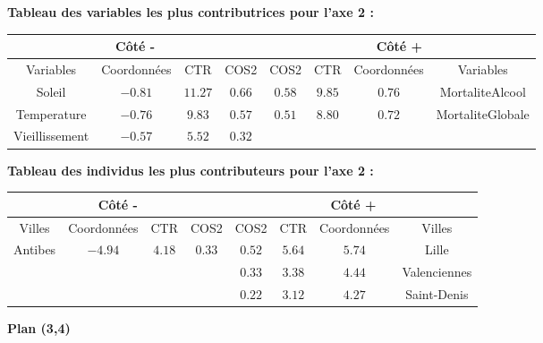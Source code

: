 \documentclass{article}
\begin{document}
\textbf{Tableau des variables les plus contributrices pour l'axe 2 :}
\begin{center}
\begin{tabular}{|c|c|c|c||c|c|c|c|}
\multicolumn{4}{c}{Côté -} & \multicolumn{4}{c}{Côté +}\\
\hline 
Variables & Coordonnées & CTR & COS2 & COS2 & CTR & Coordonnées & Variables \\ 
\hline 
Soleil & $-0.81$ & $11.27$ & $0.66$  & $0.58$  & $9.85$ & $0.76$ & MortaliteAlcool  \\ 
\hline 
 Temperature& $-0.76$ & $9.83$ & $0.57$ & $0.51$ & $8.80$ &  $0.72$ & MortaliteGlobale\\ 
\hline 
Vieillissement & $-0.57$  & $5.52$ & $0.32$ &  &  & &  \\ 
\hline 
\end{tabular} 
\end{center}

\bigskip

\textbf{Tableau des individus les plus contributeurs pour l'axe 2 :}
\begin{center}
\begin{tabular}{|c|c|c|c||c|c|c|c|}
\multicolumn{4}{c}{Côté -} & \multicolumn{4}{c}{Côté +}\\
\hline 
Villes & Coordonnées & CTR & COS2 & COS2 & CTR & Coordonnées & Villes \\ 
\hline 
Antibes & $-4.94$ & $4.18$ & $0.33$ & $0.52$ & $5.64$ & $5.74$ & Lille \\ 
\hline 
 &   &  &  & $0.33$ & $3.38$ & $4.44$ & Valenciennes\\ 
\hline 
 &  &  &  & $0.22$ & $3.12$ & $4.27$ & Saint-Denis\\ 
\hline 
\end{tabular} 
\end{center}


{\large \textbf{Plan (3,4)}}
\end{document}
